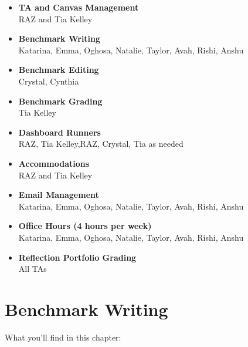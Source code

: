 \documentclass[
]{article}
\begin{document}
\begin{itemize}
\item
  \textbf{TA and Canvas Management}\\
  RAZ and Tia Kelley
\item
  \textbf{Benchmark Writing}\\
  Katarina, Emma, Oghosa, Natalie, Taylor, Avah, Rishi, Anshu
\item
  \textbf{Benchmark Editing}\\
  Crystal, Cynthia
\item
  \textbf{Benchmark Grading}\\
  Tia Kelley
\item
  \textbf{Dashboard Runners}\\
  RAZ, Tia Kelley,RAZ, Crystal, Tia as needed
\item
  \textbf{Accommodations}\\
  RAZ and Tia Kelley
\item
  \textbf{Email Management}\\
  Katarina, Emma, Oghosa, Natalie, Taylor, Avah, Rishi, Anshu
\item
  \textbf{Office Hours (4 hours per week)}\\
  Katarina, Emma, Oghosa, Natalie, Taylor, Avah, Rishi, Anshu
\item
  \textbf{Reflection Portfolio Grading}\\
  All TAs
\end{itemize}

\hypertarget{benchmark-writing}{%
\section{Benchmark Writing}\label{benchmark-writing}}

What you'll find in this chapter:
\end{document}
